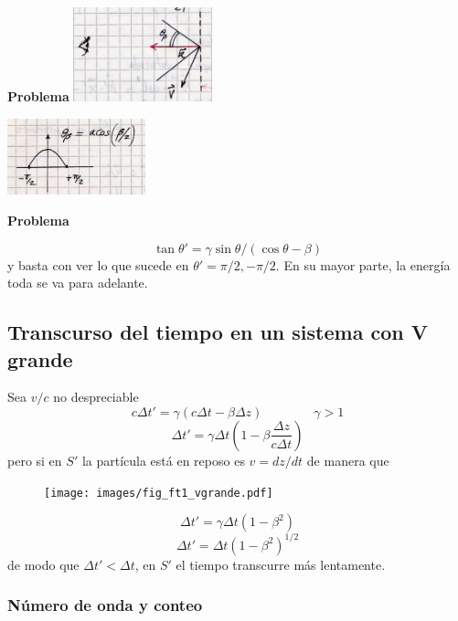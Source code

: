 \documentclass[10pt,oneside]{CBFT_book}
\begin{document}
\begin{ejemplo}{\bf Problema }
	\includegraphics[width=0.3\textwidth]{images/fig_ft1_sr_dopplerA.jpg}

\includegraphics[width=0.3\textwidth]{images/fig_ft1_sr_dopplerB.jpg} 
 
\end{ejemplo}

\begin{ejemplo}{\bf Problema}

\[
	\tan\theta' = \gamma \sin\theta /( \cos\theta - \beta)
\]
y basta con ver lo que sucede en $\theta'= \pi/2, -\pi/2$. En su mayor parte, la energía toda
se va para adelante.

\end{ejemplo}


\subsection{Transcurso del tiempo en un sistema con V grande}

Sea $v/c$ no despreciable 
\[
	c \Delta t' = \gamma ( c\Delta t - \beta \Delta z) \qquad \qquad \gamma >1
\]
\[
	\Delta t' = \gamma \Delta t \left( 1 - \beta \frac{\Delta z}{c\Delta t} \right)
\]
pero si en $S'$ la partícula está en reposo es $v = dz/dt $ de manera que 
\begin{figure}[htb]
	\begin{center}
	\texttt{[image: images/fig\_ft1\_vgrande.pdf]} 
	\end{center}
	\caption{}
\end{figure} 
\[
	\Delta t' = \gamma \Delta t ( 1 - \beta^2)
\]
\[
	\Delta t' = \Delta t ( 1 - \beta^2)^{1/2}
\]
de modo que $ \Delta t' < \Delta t$, en $S'$ el tiempo transcurre más lentamente.

\subsubsection{Número de onda y conteo}
\end{document}
